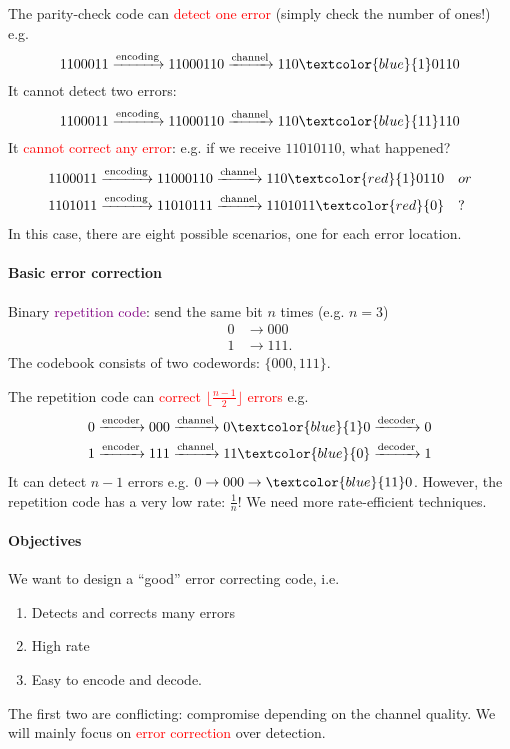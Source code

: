 \documentclass[a4paper, 11pt, openany]{book}
\numberwithin{equation}{section}
\theoremstyle{plain}
\theoremstyle{definition}
\newcommand{\Important}[1]{\textcolor{red}{#1}}
\newcommand{\Structure}[1]{\textcolor{blue}{#1}}
\newcommand{\Define}[1]{\textcolor{purple}{#1}}
\begin{document}
%

The parity-check code can \Important{detect one error} (simply check the number of ones!) e.g. 
\[
	1100011 \xrightarrow{\text{encoding}} 11000110 \xrightarrow{\text{channel}} 110\Structure{1}0110
\]
It cannot detect two errors: 
\[
	1100011 \xrightarrow{\text{encoding}} 11000110 \xrightarrow{\text{channel}} 110\Structure{11}110
\]
It \Important{cannot correct any error}: e.g. if we receive $11010110$, what happened?
\begin{align*}
	1100011 \xrightarrow{\text{encoding}} 11000110 &\xrightarrow{\text{channel}} 110\Important{1}0110 \quad or \\
	1101011 \xrightarrow{\text{encoding}} 11010111 &\xrightarrow{\text{channel}} 1101011\Important{0} \quad ?
\end{align*}
In this case, there are eight possible scenarios, one for each error location.


\paragraph{Basic error correction}
Binary \Define{repetition code}: send the same bit $n$ times (e.g. $n=3$)
\begin{align*}
	0 &\to 000\\
	1 &\to 111.
\end{align*}
The codebook consists of two codewords: $\{000,111\}$.

The repetition code can \Important{correct $\lfloor \frac{n-1}{2} \rfloor$ errors} e.g. 
\begin{align*}
	0 &\xrightarrow{\text{encoder}} 000 \xrightarrow{\text{channel}} 0\Structure{1}0 \xrightarrow{\text{decoder}} 0\\
	1 &\xrightarrow{\text{encoder}} 111 \xrightarrow{\text{channel}} 11\Structure{0} \xrightarrow{\text{decoder}} 1
\end{align*}
It can detect $n-1$ errors e.g. $0 \to 000 \to \Structure{11}0$. However, the repetition code has a very low rate: $\frac{1}{n}$! We need more rate-efficient techniques.



\paragraph{Objectives}
We want to design a ``good'' error correcting code, i.e.
\begin{enumerate}
	\item Detects and corrects many errors
	\item High rate
	\item Easy to encode and decode.
\end{enumerate}
The first two are conflicting: compromise depending on the channel quality. We will mainly focus on \Important{error correction} over detection.
\end{document}
